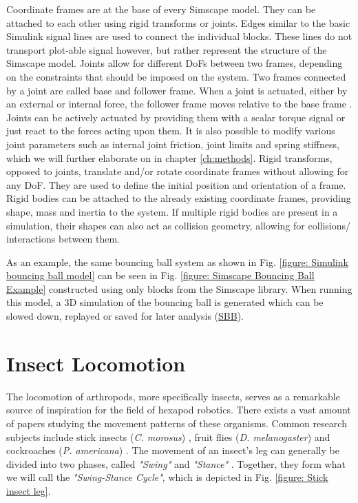 Coordinate frames are at the base of every Simscape model.
They can be attached to each other using rigid transforms or joints.
Edges similar to the basic Simulink signal lines are used to connect the individual blocks.
These lines do not transport plot-able signal however, but rather represent the structure of the Simscape model.
Joints allow for different DoFs between two frames, depending on the constraints that should be imposed on the system.
Two frames connected by a joint are called base and follower frame.
When a joint is actuated, either by an external or internal force, the follower frame moves relative to the base frame \parencite{thilderkvist2015motion}.
Joints can be actively actuated by providing them with a scalar torque signal or just react to the forces acting upon them.
It is also possible to modify various joint parameters such as internal joint friction, joint limits and spring stiffness, which we will further elaborate on in chapter \ref{ch:methods}.
Rigid transforms, opposed to joints, translate and/or rotate coordinate frames without allowing for any DoF.
They are used to define the initial position and orientation of a frame.
Rigid bodies can be attached to the already existing coordinate frames, providing shape, mass and inertia to the system.
If multiple rigid bodies are present in a simulation, their shapes can also act as collision geometry, allowing for collisions/ interactions between them.

As an example, the same bouncing ball system as shown in Fig. \ref{figure: Simulink bouncing ball model} can be seen in Fig. \ref{figure: Simscape Bouncing Ball Example} constructed using only blocks from the Simscape library. When running this model, a 3D simulation of the bouncing ball is generated which can be slowed down, replayed or saved for later analysis (\hyperref[vid: Simscape]{SBB}).

\section{Insect Locomotion}
The locomotion of arthropods, more specifically insects, serves as a remarkable source of inspiration for the field of hexapod robotics.
There exists a vast amount of papers studying the movement patterns of these organisms.
Common research subjects include stick insects (\textit{C. morosus}) \parencite{cruse1990mechanisms}, fruit flies (\textit{D. melanogaster}) \parencite{strauss1990coordination} and cockroaches (\textit{P. americana}) \parencite{delcomyn1971locomotion}. 
The movement of an insect's leg can generally be divided into two phases, called \emph{"Swing"} and \emph{"Stance"} \parencite{schilling2013walknet}.
Together, they form what we will call the \emph{"Swing-Stance Cycle"}, which is depicted in Fig. \ref{figure: Stick insect leg}.


